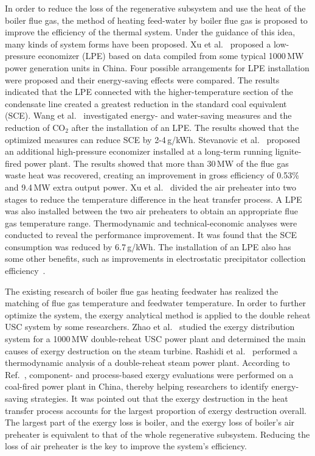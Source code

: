 \documentclass[preprint,12pt]{elsarticle}
\begin{document}
In order to reduce the loss of the regenerative subsystem and use the heat of the boiler flue gas, the method of heating feed-water by boiler flue gas is proposed to improve the efficiency of the thermal system. 
Under the guidance of this idea, many kinds of system forms have been proposed.
Xu et al.~\cite{Xu2013Techno} proposed a low-pressure economizer (LPE) based on data compiled from some typical 1000\,MW power generation units in China. 
Four possible arrangements for LPE installation were proposed and their energy-saving effects were compared.
The results indicated that the LPE connected with the higher-temperature section of the condensate line created a greatest reduction in the standard coal equivalent (SCE).  
Wang et al.~\cite{Wang2012Application} investigated energy- and water-saving measures and the reduction of CO$_2$ after the installation of an LPE.
The results showed that the optimized measures can reduce SCE by 2-4\,g/kWh.
Stevanovic et al.~\cite{Stevanovic2014Efficiency} proposed an additional high-pressure economizer installed at a long-term running lignite-fired power plant.
The results showed that more than 30\,MW of the flue gas waste heat was recovered, creating an improvement in gross efficiency of 0.53\% and 9.4\,MW extra output power.
Xu et al.~\cite{Xu2013A} divided the air preheater into two stages to reduce the temperature difference in the heat transfer process.
A LPE was also installed between the two air preheaters to obtain an appropriate flue gas temperature range.
Thermodynamic and technical-economic analyses were conducted to reveal the performance improvement.
It was found that the SCE consumption was reduced by 6.7\,g/kWh.
The installation of an LPE also has some  other benefits, such as improvements in electrostatic precipitator collection efficiency~\cite{Li2016Low}.

The existing research of boiler flue gas heating feedwater has realized the matching of flue gas temperature and feedwater temperature.
In order to further optimize the system, the exergy analytical method is applied to the double reheat USC system by some researchers.
Zhao et al.~\cite{Zhao2017Exergy} studied the exergy distribution system for a 1000\,MW double-reheat USC power plant and determined the main causes of exergy destruction on the steam turbine.
Rashidi et al.~\cite{Rashidi2014Thermodynamic} performed a thermodynamic analysis of a double-reheat steam power plant.
According to Ref.~\cite{Wu2014Component}, component- and process-based exergy evaluations were performed on a coal-fired power plant in China, thereby helping researchers to identify energy-saving strategies.
It was pointed out that the exergy destruction in the heat transfer process accounts for the largest proportion of exergy destruction overall.
The largest part of the exergy loss is boiler, and the exergy loss of boiler's air preheater is equivalent to that of the whole regenerative subsystem.
Reducing the loss of air preheater is the key to improve the system's efficiency.
\end{document}
